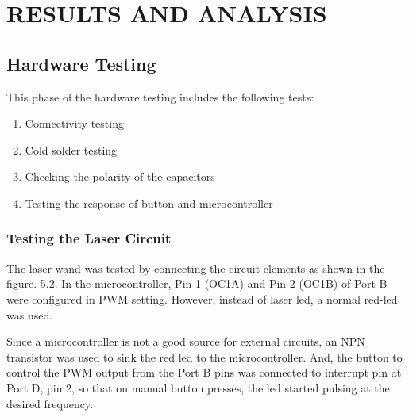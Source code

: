 \documentclass[12pt, a4paper]{article}
\begin{document}
\section{RESULTS AND ANALYSIS}

\subsection{Hardware Testing}

This phase of the hardware testing includes the following tests:
\begin{enumerate}
\item Connectivity testing
\item Cold solder testing
\item Checking the polarity of the capacitors
\item Testing the response of button and microcontroller
\end{enumerate}

\subsubsection{Testing the Laser Circuit}

The laser wand was tested by connecting the circuit elements as shown in the figure. 5.2. In the microcontroller, Pin 1 (OC1A) and Pin 2 (OC1B) of Port B were configured in PWM setting. However, instead of laser led, a normal red-led was used. 

Since a microcontroller is not a good source for external circuits, an NPN transistor was used to sink the red led to the microcontroller. And, the button to control the PWM output from the Port B pins was connected to interrupt pin at Port D, pin 2, so that on manual button presses, the led started pulsing at the desired frequency.
\end{document}
